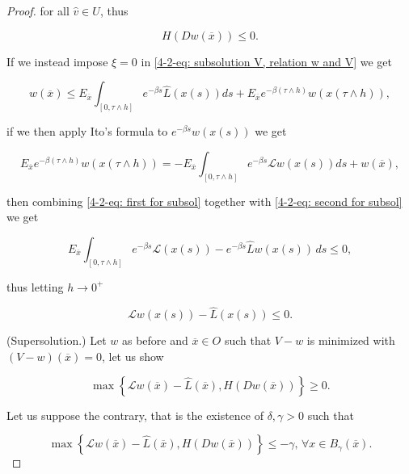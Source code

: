 \begin{theorem}
\begin{proof}
        for all $\hat{v}\in U$, thus

        \[H(Dw(\overline{x}))\leq 0.\]

        If we instead impose $\xi=0$ in \eqref{4-2-eq: subsolution V, relation w and V} we get
        
        \begin{equation}\label{4-2-eq: first for subsol}
            w(\overline{x}) \leq E_{\overline{x}} \int_{[0,\tau\land h]} e^{-\beta s}\hat{L}(x(s))ds + E_{\overline{x}}e^{-\beta(\tau\land h)}w(x(\tau\land h)),
        \end{equation}    
        
        if we then apply Ito's formula to $e^{-\beta s}w(x(s))$ we get 

        \begin{equation}\label{4-2-eq: second for subsol}
            E_{\overline{x}}e^{-\beta(\tau\land h)}w(x(\tau\land h)) = - E_{\overline{x}} \int_{[0,\tau\land h]} e^{-\beta s}\mathcal{L}w(x(s))ds + w(\overline{x}),
        \end{equation}

        then combining \eqref{4-2-eq: first for subsol} together with \eqref{4-2-eq: second for subsol} we get

        \begin{equation}
            E_{\overline{x}} \int_{[0,\tau\land h]} e^{-\beta s}\mathcal{L}(x(s)) - e^{-\beta s}\hat{L}w(x(s))\,ds\leq 0,  
        \end{equation}

        thus letting $h\to0^+$

        \begin{equation}
            \mathcal{L}w(x(s)) - \hat{L}(x(s))\leq 0.
        \end{equation}

        (Supersolution.) Let $w$ as before and $\overline{x}\in O$ such that $V-w$ is minimized with $(V-w)(\overline{x})=0$, let us show

        \begin{equation}
            \max\left\{\mathcal{L}w(\overline{x}) - \hat{L}(\overline{x}), H(Dw(\overline{x}))\right\} \geq 0.
        \end{equation}

        Let us suppose the contrary, that is the existence of $\delta,\gamma>0$ such that

        \begin{equation}
            \max\left\{\mathcal{L}w(\overline{x}) - \hat{L}(\overline{x}), H(Dw(\overline{x}))\right\} \leq -\gamma, \,\forall x\in B_{\gamma}(\overline{x}).
        \end{equation}


\end{proof}
\end{theorem}
